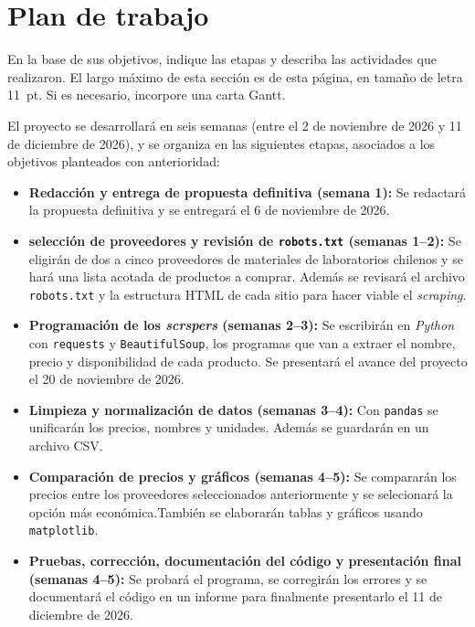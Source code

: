 \documentclass[11pt,spanish]{article}
\begin{document}
\section{Plan de trabajo}

\begin{framed}
  \noindent En la base de sus objetivos, indique las etapas y describa
  las actividades que realizaron. El largo máximo de esta sección es de
  esta página, en tamaño de letra 11~pt. Si es necesario, incorpore una
  carta Gantt.
\end{framed}
El proyecto se desarrollará en seis semanas (entre el 2 de noviembre de 2026 y 11 de diciembre de 2026), y se organiza en las siguientes etapas, asociados a los objetivos planteados con anterioridad:
\begin{itemize}
\item \textbf{Redacción y entrega de propuesta definitiva (semana 1):} Se redactará la propuesta definitiva y se entregará el 6 de noviembre de 2026.
\item \textbf{selección de proveedores y revisión de \texttt{robots.txt} (semanas 1--2):} Se eligirán de dos a cinco proveedores de materiales de laboratorios chilenos y se hará una lista acotada de productos a comprar. Además se revisará el archivo \texttt{robots.txt} y la estructura HTML de cada sitio para hacer viable el \textit{scraping}.
\item \textbf{Programación de los \textit{scrspers} (semanas 2--3):} Se escribirán en \textit{Python} con \texttt{requests} y \texttt{BeautifulSoup}, los programas que van a extraer el nombre, precio y disponibilidad de cada producto. Se presentará el avance del proyecto el 20 de noviembre de 2026.
\item \textbf{Limpieza y normalización de datos (semanas 3--4):} Con \texttt{pandas} se unificarán los precios, nombres y unidades. Además se guardarán en un archivo CSV.
\item \textbf{Comparación de precios y gráficos (semanas 4--5):} Se compararán los precios entre los proveedores seleccionados anteriormente y se selecionará la opción más económica.También se elaborarán tablas y gráficos usando \texttt{matplotlib}.
\item \textbf{Pruebas, corrección, documentación del código y presentación final (semanas 4--5):} Se probará el programa, se corregirán los errores y se documentará el código en un informe para finalmente presentarlo el 11 de diciembre de 2026.
\end{itemize}
\end{document}
